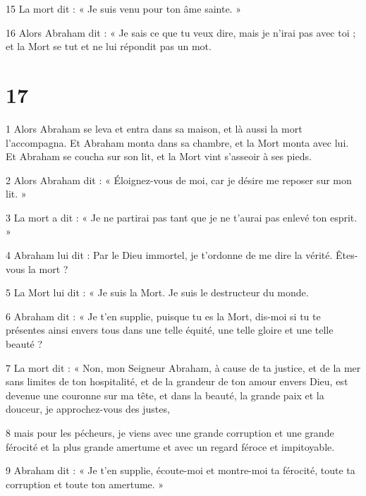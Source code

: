 \par 15 La mort dit : « Je suis venu pour ton âme sainte. »

\par 16 Alors Abraham dit : « Je sais ce que tu veux dire, mais je n'irai pas avec toi ; et la Mort se tut et ne lui répondit pas un mot.

\chapter{17}

\par 1 Alors Abraham se leva et entra dans sa maison, et là aussi la mort l'accompagna. Et Abraham monta dans sa chambre, et la Mort monta avec lui. Et Abraham se coucha sur son lit, et la Mort vint s'asseoir à ses pieds.

\par 2 Alors Abraham dit : « Éloignez-vous de moi, car je désire me reposer sur mon lit. »

\par 3 La mort a dit : « Je ne partirai pas tant que je ne t'aurai pas enlevé ton esprit. »

\par 4 Abraham lui dit : Par le Dieu immortel, je t'ordonne de me dire la vérité. Êtes-vous la mort ?

\par 5 La Mort lui dit : « Je suis la Mort. Je suis le destructeur du monde.

\par 6 Abraham dit : « Je t'en supplie, puisque tu es la Mort, dis-moi si tu te présentes ainsi envers tous dans une telle équité, une telle gloire et une telle beauté ?

\par 7 La mort dit : « Non, mon Seigneur Abraham, à cause de ta justice, et de la mer sans limites de ton hospitalité, et de la grandeur de ton amour envers Dieu, est devenue une couronne sur ma tête, et dans la beauté, la grande paix et la douceur, je approchez-vous des justes,

\par 8 mais pour les pécheurs, je viens avec une grande corruption et une grande férocité et la plus grande amertume et avec un regard féroce et impitoyable.

\par 9 Abraham dit : « Je t’en supplie, écoute-moi et montre-moi ta férocité, toute ta corruption et toute ton amertume. »


